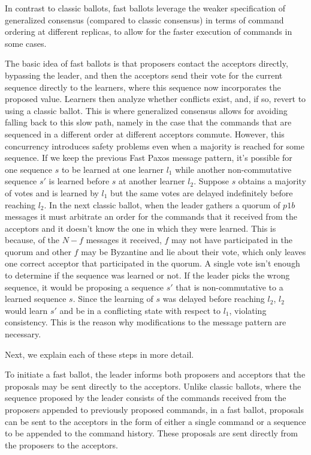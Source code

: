 In contrast to classic ballots, fast ballots leverage the weaker specification of generalized consensus (compared to classic consensus) in terms of command ordering at different replicas, to allow for the faster execution of commands in some cases.\par
The basic idea of fast ballots is that proposers contact the acceptors directly, bypassing the leader, and then the acceptors send their vote for the current sequence directly to the learners, where this sequence now incorporates the proposed value. Learners then analyze whether conflicts exist, and, if so, revert to using a classic ballot. This is where generalized consensus allows for avoiding falling back to this slow path, namely in the case that the commands that are sequenced in a different order at different acceptors commute. However, this concurrency introduces safety problems even when a majority is reached for some sequence. If we keep the previous Fast Paxos message pattern, it's possible for one sequence $s$ to be learned at one learner $l_1$ while another non-commutative sequence $s'$ is learned before $s$ at another learner $l_2$. Suppose $s$ obtains a majority of votes and is learned by $l_1$ but the same votes are delayed indefinitely before reaching $l_2$. In the next classic ballot, when the leader gathers a quorum of $p1b$ messages it must arbitrate an order for the commands that it received from the acceptors and it doesn't know the one in which they were learned. This is because, of the $N-f$ messages it received, $f$ may not have participated in the quorum and other $f$ may be Byzantine and lie about their vote, which only leaves one correct acceptor that participated in the quorum. A single vote isn't enough to determine if the sequence was learned or not. If the leader picks the wrong sequence, it would be proposing a sequence $s'$ that is non-commutative to a learned sequence $s$. Since the learning of $s$ was delayed before reaching $l_2$, $l_2$ would learn $s'$ and be in a conflicting state with respect to $l_1$, violating consistency. This is the reason why modifications to the message pattern are necessary.\par
Next, we explain each of these steps in more detail.

To initiate a fast ballot, the leader informs both proposers and acceptors that the proposals may be sent directly to the acceptors. Unlike classic ballots, where the sequence proposed by the leader consists of the commands received from the proposers appended to previously proposed commands, in a fast ballot, proposals can be sent to the acceptors in the form of either a single command or a sequence to be appended to the command history. These proposals are sent directly from the proposers to the acceptors.\par

